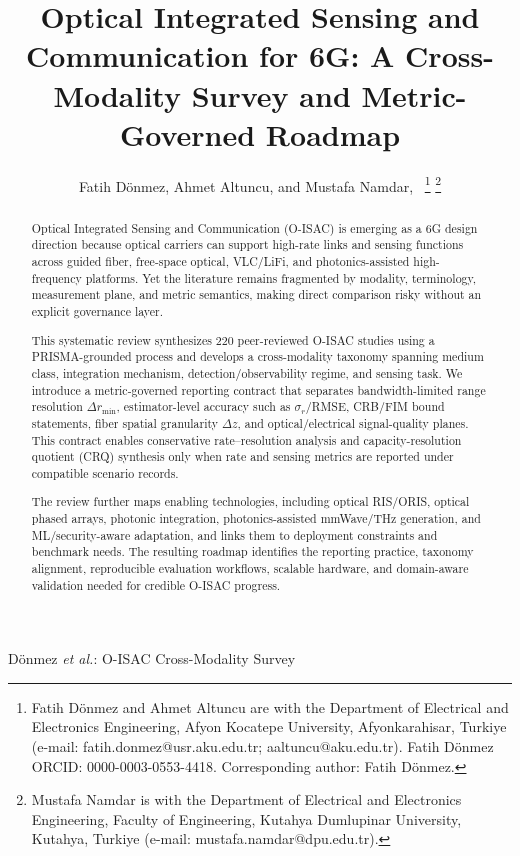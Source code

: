 \documentclass[letterpaper,journal]{IEEEtran}
\begin{document}
\title{Optical Integrated Sensing and Communication for 6G: A Cross-Modality Survey and Metric-Governed Roadmap}

\author{Fatih D\"onmez, Ahmet Altuncu, and Mustafa Namdar,~%
    \thanks{Fatih D\"onmez and Ahmet Altuncu are with the Department of Electrical and Electronics Engineering, Afyon Kocatepe University, Afyonkarahisar, Turkiye (e-mail: fatih.donmez@usr.aku.edu.tr; aaltuncu@aku.edu.tr). Fatih D\"onmez ORCID: 0000-0003-0553-4418. Corresponding author: Fatih D\"onmez.}%
    \thanks{Mustafa Namdar is with the Department of Electrical and Electronics Engineering, Faculty of Engineering, Kutahya Dumlupinar University, Kutahya, Turkiye (e-mail: mustafa.namdar@dpu.edu.tr).}}

%
{D\"onmez \MakeLowercase{\textit{et al.}}: O-ISAC Cross-Modality Survey}

\maketitle

\begin{abstract}
    Optical Integrated Sensing and Communication (O-ISAC) is emerging as a 6G design direction because optical carriers can support high-rate links and sensing functions across guided fiber, free-space optical, VLC/LiFi, and photonics-assisted high-frequency platforms. Yet the literature remains fragmented by modality, terminology, measurement plane, and metric semantics, making direct comparison risky without an explicit governance layer.

    This systematic review synthesizes 220 peer-reviewed O-ISAC studies using a PRISMA-grounded process and develops a cross-modality taxonomy spanning medium class, integration mechanism, detection/observability regime, and sensing task. We introduce a metric-governed reporting contract that separates bandwidth-limited range resolution $\Delta r_{\min}$, estimator-level accuracy such as $\sigma_r$/RMSE, CRB/FIM bound statements, fiber spatial granularity $\Delta z$, and optical/electrical signal-quality planes. This contract enables conservative rate--resolution analysis and capacity-resolution quotient (CRQ) synthesis only when rate and sensing metrics are reported under compatible scenario records.

    The review further maps enabling technologies, including optical RIS/ORIS, optical phased arrays, photonic integration, photonics-assisted mmWave/THz generation, and ML/security-aware adaptation, and links them to deployment constraints and benchmark needs. The resulting roadmap identifies the reporting practice, taxonomy alignment, reproducible evaluation workflows, scalable hardware, and domain-aware validation needed for credible O-ISAC progress.
\end{abstract}
\end{document}
